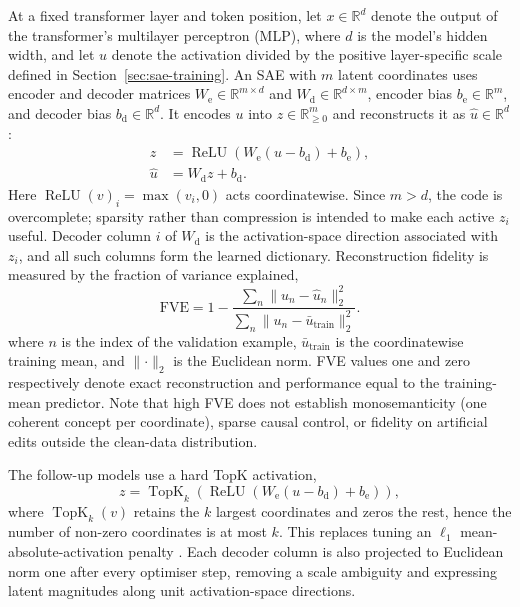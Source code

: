 \documentclass[11pt,a4paper]{article}
\newcommand{\FVE}{\mathrm{FVE}} %
\begin{document}
    At a fixed transformer layer and token position, let $x\in\mathbb{R}^{d}$ denote the output of the transformer's multilayer perceptron (MLP), where $d$ is the model's hidden width, and let $u$ denote the activation divided by the positive layer-specific scale defined in Section~\ref{sec:sae-training}. An SAE with $m$ latent coordinates uses encoder and decoder matrices $W_{\mathrm e}\in\mathbb{R}^{m\times d}$ and $W_{\mathrm d}\in\mathbb{R}^{d\times m}$, encoder bias $b_{\mathrm e}\in\mathbb{R}^{m}$, and decoder bias $b_{\mathrm d}\in\mathbb{R}^{d}$. It encodes $u$ into $z\in\mathbb{R}_{\geq0}^{m}$ and reconstructs it as $\hat u\in\mathbb{R}^{d}$:
    \begin{align}     z &= \operatorname{ReLU} \left(W_{\mathrm e}(u-b_{\mathrm d})          +b_{\mathrm e}\right), \\
        \hat{u} &= W_{\mathrm d}z+b_{\mathrm d}.
        \label{eq:relu-sae}
    \end{align}
    Here $\operatorname{ReLU}(v)_i=\max(v_i,0)$ acts coordinatewise. Since $m>d$, the code is overcomplete; sparsity rather than compression is intended to make each active $z_i$ useful. Decoder column $i$ of $W_{\mathrm d}$ is the activation-space direction associated with $z_i$, and all such columns form the learned dictionary. Reconstruction fidelity is measured by the fraction of variance explained,
    \begin{equation}
        \FVE=1-\frac{\sum_n\lVert u_n-\hat{u}_n\rVert_2^2}
        {\sum_n\lVert u_n-\bar{u}_{\mathrm{train}}\rVert_2^2}.
        \label{eq:fve}
    \end{equation}
    where $n$ is the index of the validation example, $\bar u_{\mathrm{train}}$ is the coordinatewise training mean, and $\lVert\cdot\rVert_2$ is the Euclidean norm. FVE values one and zero respectively denote exact reconstruction and performance equal to the training-mean predictor. Note that high FVE does not establish monosemanticity (one coherent concept per coordinate), sparse causal control, or fidelity on artificial edits outside the clean-data distribution.

    The follow-up models use a hard TopK activation,
    \begin{equation}     z=\operatorname{TopK}_{k}\!\left(
      \operatorname{ReLU}(W_{\mathrm e}(u-b_{\mathrm d})+b_{\mathrm e})
      \right),
    \label{eq:topk}
    \end{equation} where $\operatorname{TopK}_k(v)$ retains the $k$ largest coordinates and zeros the rest, hence the number of non-zero coordinates is at most $k$. This replaces tuning an $\ell_1$ mean-absolute-activation penalty \cite{gao2024scaling}. Each decoder column is also projected to Euclidean norm one after every optimiser step, removing a scale ambiguity and expressing latent magnitudes along unit activation-space directions.
\end{document}
